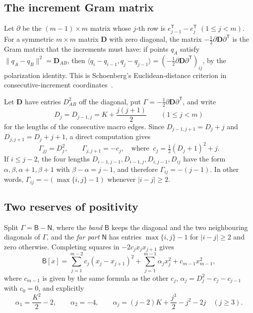 \documentclass[11pt]{amsart}
\numberwithin{equation}{section}
\theoremstyle{definition}
\theoremstyle{remark}
\newcommand{\ip}[2]{\langle #1,#2\rangle}
\newcommand{\norm}[1]{\lVert #1\rVert}
\newcommand{\T}{\mathsf T}          %
\begin{document}
\subsection{The increment Gram matrix}\label{sec:app-gram}

Let $\partial$ be the $(m-1)\times m$ matrix whose $j$-th row is
$e_{j-1}^\T-e_j^\T$ $(1\le j<m)$. For a symmetric $m\times m$ matrix
$\mathbf D$ with zero diagonal, the matrix $-\frac12\partial\mathbf
D\partial^\T$ is the Gram matrix that the increments must have: if points
$q_A$ satisfy $\norm{q_A-q_B}^2=\mathbf D_{AB}$, then
$\ip{q_i-q_{i-1}}{q_j-q_{j-1}}=(-\frac12\partial\mathbf D\partial^\T)_{ij}$,
by the polarization identity. This is Schoenberg's Euclidean-distance
criterion in consecutive-increment coordinates~\cite[Theorem~1]{Schoenberg}.

Let $\mathbf D$ have entries $D_{AB}^2$ off the diagonal, put
$\Gamma=-\frac12\partial\mathbf D\partial^\T$, and write
\[
 D_j=D_{j-1,j}=K+\frac{j(j+1)}2\qquad(1\le j<m)
\]
for the lengths of the consecutive macro edges. Since
$D_{j-1,j+1}=D_j+j$ and $D_{j,j+1}=D_j+j+1$, a direct computation gives
\begin{equation}\label{eq:gram-entries}
 \Gamma_{jj}=D_j^2,\qquad
 \Gamma_{j,j+1}=-c_j,\quad\text{where }\ c_j=\tfrac12(D_j+1)^2+j.
\end{equation}
If $i\le j-2$, the four lengths $D_{i-1,j-1},D_{i-1,j},D_{i,j-1},D_{ij}$ have
the form $\alpha,\beta,\alpha+1,\beta+1$ with $\beta-\alpha=j-1$, and
therefore $\Gamma_{ij}=-(j-1)$. In other words, $\Gamma_{ij}=-(\max\{i,j\}-1)$
whenever $|i-j|\ge2$.

\subsection{Two reserves of positivity}\label{sec:app-reserves}

Split $\Gamma=\mathsf B-\mathsf N$, where the \emph{band} $\mathsf B$
keeps the diagonal and the two neighbouring diagonals of $\Gamma$, and the
\emph{far part} $\mathsf N$ has entries $\max\{i,j\}-1$ for $|i-j|\ge2$
and zero otherwise. Completing squares in $-2c_jx_jx_{j+1}$ gives
\begin{equation}\label{eq:tridiagonal}
 \mathsf B[x]=\sum_{j=1}^{m-2}c_j(x_j-x_{j+1})^2
              +\sum_{j=1}^{m-1}\alpha_jx_j^2+c_{m-1}x_{m-1}^2,
\end{equation}
where $c_{m-1}$ is given by the same formula as the other $c_j$,
$\alpha_j=D_j^2-c_j-c_{j-1}$ with $c_0=0$, and explicitly
\[
 \alpha_1=\frac{K^2}2-2,\qquad \alpha_2=-4,\qquad
 \alpha_j=(j-2)K+\frac{j^3}2-j^2-2j\quad(j\ge3).
\]
\end{document}
